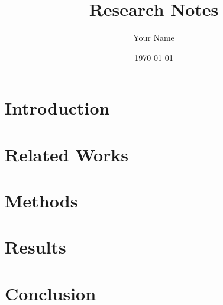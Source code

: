 \documentclass{article}
\title{Research Notes}
\author{Your Name}
\date{\today}
\begin{document}
\maketitle
\section{Introduction}

\section{Related Works}

\section{Methods}


\section{Results}

\section{Conclusion}
\end{document}
